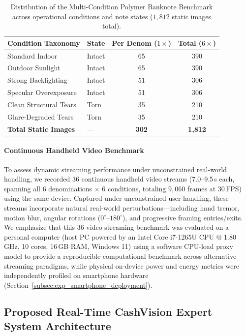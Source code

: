 \documentclass[final,5p,times,twocolumn,authoryear]{elsarticle}
\begin{document}
\begin{table}[!tb]
\centering
\caption{Distribution of the Multi-Condition Polymer Banknote Benchmark across operational conditions and note states ($1{,}812$ static images total).}
\label{tab:dataset_distribution}
\scriptsize
\setlength{\tabcolsep}{3pt}
\renewcommand{\arraystretch}{1.15}
\begin{tabular}{llcc}
\toprule
\textbf{Condition Taxonomy} & \textbf{State} &
\textbf{Per Denom ($1\times$)} & \textbf{Total ($6\times$)} \\
\midrule
Standard Indoor & Intact & 65 & 390 \\
Outdoor Sunlight & Intact & 65 & 390 \\
Strong Backlighting & Intact & 51 & 306 \\
Specular Overexposure & Intact & 51 & 306 \\
Clean Structural Tears & Torn & 35 & 210 \\
Glare-Degraded Tears & Torn & 35 & 210 \\
\midrule
\textbf{Total Static Images} & --- & \textbf{302} & \textbf{1,812} \\
\bottomrule
\end{tabular}
\end{table}

\paragraph{Continuous Handheld Video Benchmark}
To assess dynamic streaming performance under unconstrained real-world handling, we recorded 36 continuous handheld video streams (7.0--9.5\,s each, spanning all 6 denominations $\times$ 6 conditions, totaling $9{,}060$ frames at $30$\,FPS) using the same device. Captured under unconstrained user handling, these streams incorporate natural real-world perturbations---including hand tremor, motion blur, angular rotations ($0^\circ$--$180^\circ$), and progressive framing entries/exits. We emphasize that this 36-video streaming benchmark was evaluated on a personal computer (host PC powered by an Intel Core i7-1265U CPU @ 1.80\,GHz, 10 cores, 16\,GB RAM, Windows 11) using a software CPU-load proxy model to provide a reproducible computational benchmark across alternative streaming paradigms, while physical on-device power and energy metrics were independently profiled on smartphone hardware (Section~\ref{subsec:exp_smartphone_deployment}).

\subsection{Proposed Real-Time CashVision Expert System Architecture}
\label{subsec:architecture}
\end{document}
